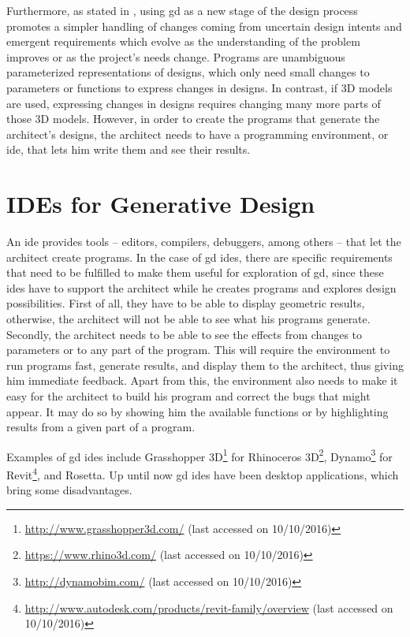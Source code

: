 Furthermore, as stated in \cite{leitao2014pushing}, using \gls{gd} as a new stage of the design process promotes a simpler handling of changes coming from uncertain design intents and emergent requirements which evolve as the understanding of the problem improves or as the project's needs change.
Programs are unambiguous parameterized representations of designs, which only need small changes to parameters or functions to express changes in designs.
In contrast, if 3D models are used, expressing changes in designs requires changing many more parts of those 3D models.
However, in order to create the programs that generate the architect's designs, the architect needs to have a programming environment, or \gls{ide}, that lets him write them and see their results.


\section{IDEs for Generative Design}
An \gls{ide} provides tools -- editors, compilers, debuggers, among others -- that let the architect create programs.
In the case of \gls{gd} \glspl{ide}, there are specific requirements that need to be fulfilled to make them useful for exploration of \gls{gd}, since these \glspl{ide} have to support the architect while he creates programs and explores design possibilities.
First of all, they have to be able to display geometric results, otherwise, the architect will not be able to see what his programs generate.
Secondly, the architect needs to be able to see the effects from changes to parameters or to any part of the program.
This will require the environment to run programs fast, generate results, and display them to the architect, thus giving him immediate feedback.
Apart from this, the environment also needs to make it easy for the architect to build his program and correct the bugs that might appear.
It may do so by showing him the available functions or by highlighting results from a given part of a program.

Examples of \gls{gd} \glspl{ide} include Grasshopper 3D\footnote{\url{http://www.grasshopper3d.com/} (last accessed on 10/10/2016)} for Rhinoceros 3D\footnote{\url{https://www.rhino3d.com/} (last accessed on 10/10/2016)}, Dynamo\footnote{\url{http://dynamobim.com/} (last accessed on 10/10/2016)} for Revit\footnote{\url{http://www.autodesk.com/products/revit-family/overview} (last accessed on 10/10/2016)}, and Rosetta\cite{de2012modern}.
Up until now \gls{gd} \glspl{ide} have been desktop applications, which bring some disadvantages.



